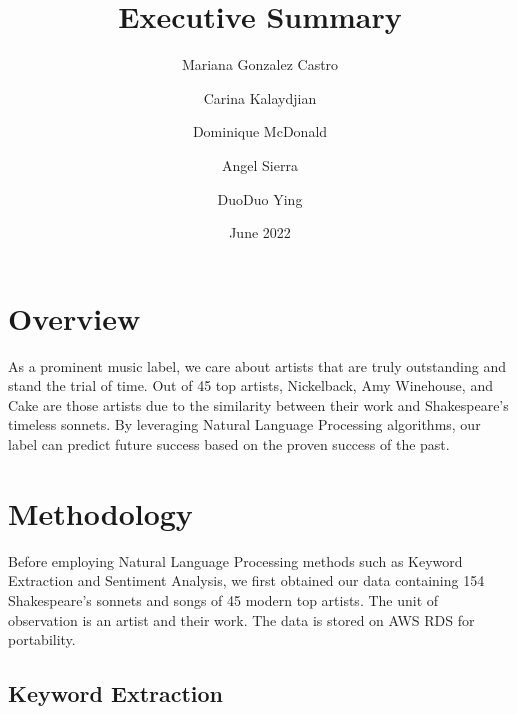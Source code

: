 \documentclass[10pt,a4paper]{article}
\title{Executive Summary}
\author[*]{Mariana Gonzalez Castro}
\author[*]{Carina Kalaydjian}
\author[*]{Dominique McDonald}
\author[*]{Angel Sierra}
\author[*]{DuoDuo Ying}
\affil[*]{Department of Statistics, UCLA}
\date{June 2022}
\begin{document}
\maketitle

\section{Overview}

As a prominent music label, we care about artists that are truly outstanding and stand the trial of time. Out of 45 top artists, Nickelback, Amy Winehouse, and Cake are those artists due to the similarity between their work and Shakespeare's timeless sonnets. By leveraging Natural Language Processing algorithms, our label can predict future success based on the proven success of the past. 

\begin{table}[ht]
\centering
{}
\caption{Ranked Top 10 Most Similar Music Artist to Shakespeare} 
\label{tab:overallranktable}
\end{table}


\section{Methodology}

Before employing Natural Language Processing methods such as Keyword Extraction and Sentiment Analysis, we first obtained our data containing 154 Shakespeare's sonnets and songs of 45 modern top artists. The unit of observation is an artist and their work. The data is stored on AWS RDS for portability.

\subsection{Keyword Extraction}
\end{document}
